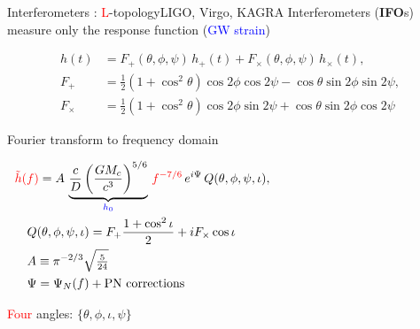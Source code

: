 \documentclass[xcolor=dvipsnames,handout,t]{beamer}
\newcommand{\red}[1]{\textcolor{red}{#1}}
\newcommand{\bl}[1]{\textcolor{blue}{#1}}
\newcommand{\f}{\frac}
\begin{document}
\begin{frame}{Interferometers : \red{L}-topology}{LIGO, Virgo, KAGRA}
\vspace{-2mm}
  Interferometers ({\bf IFO}s) measure only the response function (\bl{GW strain})
  \begin{footnotesize}
  \begin{align*}
   h(t) &= F_+(\theta,\phi,\psi) \,h_+(t)+F_\times(\theta,\phi,\psi)\, h_\times(t) , \\
    F_+ &=\f{1}{2}\left(1+\cos^2\theta\right)\cos2\phi\cos 2\psi-\cos\theta \sin2\phi \sin2\psi, \\
    F_\times &=\f{1}{2}\left(1+\cos^2\theta\right)\cos2\phi\sin2\psi+\cos\theta \sin2\phi \cos2\psi
    \end{align*}
    \end{footnotesize}
   Fourier transform to frequency domain 
  \begin{footnotesize}
  \begin{align*}
  &\red{\tilde{h}(f)} =A\, \underbrace{\f{c}{D}\left(\f{G M_c}{c^3}\right)^{5/6}}_{\bl{h_0}} \,\red{f^{-7/6}}\, e^{i\Psi}\, Q(\theta,\phi,\psi,\iota),\hspace{5cm} \\
     &\quad Q(\theta,\phi,\psi,\iota) = F_+\f{1+\cos^2\iota}{2}  + i F_\times \cos\iota \\
   &\quad A\equiv \pi^{-2/3}\sqrt{\tfrac{5}{24}}\\
   &\quad \Psi = \Psi_N(f) + \text{PN corrections}
    \end{align*}
    \end{footnotesize}
   \red{Four} angles: $\{\theta,\phi,\iota,\psi \}$
   
\end{frame}
\end{document}
